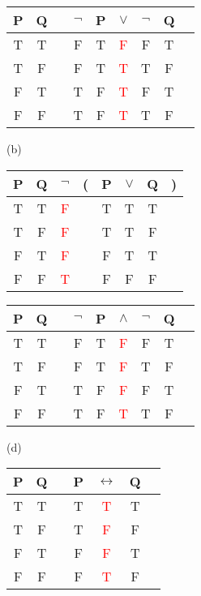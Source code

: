 \documentclass{article}
\begin{document}
\begin{tabular}{@{ }c@{ }@{ }c | c@{ }@{ }c@{ }@{ }c@{ }@{ }c@{ }@{ }c@{ }@{ }c@{ }@{ }c}
P & Q &  & $\lnot$ & P & $\lor$ & $\lnot$ & Q & \\
\hline 
T & T &  & F & T & \textcolor{red}{F} & F & T & \\
T & F &  & F & T & \textcolor{red}{T} & T & F & \\
F & T &  & T & F & \textcolor{red}{T} & F & T & \\
F & F &  & T & F & \textcolor{red}{T} & T & F & \\
\end{tabular}

(b)

\begin{tabular}{@{ }c@{ }@{ }c | c@{ }@{}c@{}@{ }c@{ }@{ }c@{ }@{ }c@{ }@{}c@{ }}
P & Q & $\lnot$ & ( & P & $\lor$ & Q & )\\
\hline 
T & T & \textcolor{red}{F} &  & T & T & T & \\
T & F & \textcolor{red}{F} &  & T & T & F & \\
F & T & \textcolor{red}{F} &  & F & T & T & \\
F & F & \textcolor{red}{T} &  & F & F & F & \\
\end{tabular}

\begin{tabular}{@{ }c@{ }@{ }c | c@{ }@{ }c@{ }@{ }c@{ }@{ }c@{ }@{ }c@{ }@{ }c@{ }@{ }c}
P & Q &  & $\lnot$ & P & $\land$ & $\lnot$ & Q & \\
\hline 
T & T &  & F & T & \textcolor{red}{F} & F & T & \\
T & F &  & F & T & \textcolor{red}{F} & T & F & \\
F & T &  & T & F & \textcolor{red}{F} & F & T & \\
F & F &  & T & F & \textcolor{red}{T} & T & F & \\
\end{tabular}

(d)

\begin{tabular}{@{ }c@{ }@{ }c | c@{ }@{ }c@{ }@{ }c@{ }@{ }c@{ }@{ }c}
P & Q &  & P & $\leftrightarrow$ & Q & \\
\hline 
T & T &  & T & \textcolor{red}{T} & T & \\
T & F &  & T & \textcolor{red}{F} & F & \\
F & T &  & F & \textcolor{red}{F} & T & \\
F & F &  & F & \textcolor{red}{T} & F & \\
\end{tabular}
\end{document}
